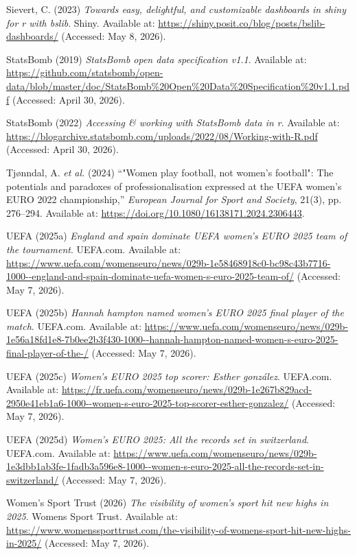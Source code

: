 \documentclass[
  11pt,
  a4paper,
  DIV=11,
  numbers=noendperiod]{scrartcl}
\newlength{\cslhangindent}
\newenvironment{CSLReferences}[2] %
 {\begin{list}{}{%
  \setlength{\itemindent}{0pt}
  \setlength{\leftmargin}{0pt}
  \setlength{\parsep}{0pt}
  \ifodd #1
   \setlength{\leftmargin}{\cslhangindent}
   \setlength{\itemindent}{-1\cslhangindent}
  \fi
  \setlength{\itemsep}{#2\baselineskip}}}
 {\end{list}}
\begin{document}
\begin{CSLReferences}{0}{1}
Sievert, C. (2023) \emph{Towards easy, delightful, and customizable
dashboards in shiny for r with {bslib}}. Shiny. Available at:
\url{https://shiny.posit.co/blog/posts/bslib-dashboards/} (Accessed: May
8, 2026).

StatsBomb (2019) \emph{StatsBomb open data specification v1.1}.
Available at:
\url{https://github.com/statsbomb/open-data/blob/master/doc/StatsBomb\%20Open\%20Data\%20Specification\%20v1.1.pdf}
(Accessed: April 30, 2026).

StatsBomb (2022) \emph{Accessing \& working with StatsBomb data in r}.
Available at:
\url{https://blogarchive.statsbomb.com/uploads/2022/08/Working-with-R.pdf}
(Accessed: April 30, 2026).

Tjønndal, A. \emph{et al.} (2024) {``"Women play football, not women's
football": The potentials and paradoxes of professionalisation expressed
at the UEFA women's EURO 2022 championship,''} \emph{European Journal
for Sport and Society}, 21(3), pp. 276--294. Available at:
\url{https://doi.org/10.1080/16138171.2024.2306443}.

UEFA (2025a) \emph{England and spain dominate UEFA women's EURO 2025
team of the tournament}. UEFA.com. Available at:
\url{https://www.uefa.com/womenseuro/news/029b-1e58468918c0-bc98c43b7716-1000--england-and-spain-dominate-uefa-women-s-euro-2025-team-of/}
(Accessed: May 7, 2026).

UEFA (2025b) \emph{Hannah hampton named women's EURO 2025 final player
of the match}. UEFA.com. Available at:
\url{https://www.uefa.com/womenseuro/news/029b-1e56a18fd1e8-7b0ee2b3f430-1000--hannah-hampton-named-women-s-euro-2025-final-player-of-the-/}
(Accessed: May 7, 2026).

UEFA (2025c) \emph{Women's EURO 2025 top scorer: Esther gonzález}.
UEFA.com. Available at:
\url{https://fr.uefa.com/womenseuro/news/029b-1e267b829acd-2950e41eb1a6-1000--women-s-euro-2025-top-scorer-esther-gonzalez/}
(Accessed: May 7, 2026).

UEFA (2025d) \emph{Women's EURO 2025: All the records set in
switzerland}. UEFA.com. Available at:
\url{https://www.uefa.com/womenseuro/news/029b-1e3dbb1ab3fe-1fadb3a596e8-1000--women-s-euro-2025-all-the-records-set-in-switzerland/}
(Accessed: May 7, 2026).

Women's Sport Trust (2026) \emph{The visibility of women's sport hit new
highs in 2025}. Womens Sport Trust. Available at:
\url{https://www.womenssporttrust.com/the-visibility-of-womens-sport-hit-new-highs-in-2025/}
(Accessed: May 7, 2026).

\end{CSLReferences}
\end{document}
